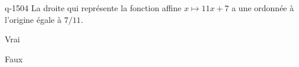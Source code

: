 \begin{truefalse}{q-1504}
La droite qui représente la fonction affine $x\mapsto 11x+7$ a une ordonnée à l'origine égale à $7/11$.
\item Vrai
\item* Faux
\end{truefalse}

